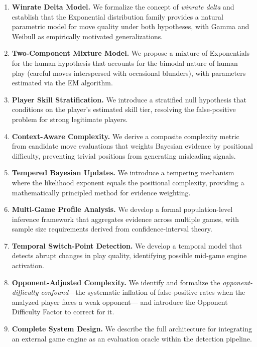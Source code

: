 \documentclass[11pt,a4paper]{article}
\begin{document}
\begin{enumerate}
    \item \textbf{Winrate Delta Model.} We formalize the concept of
          \emph{winrate delta} and establish that the Exponential distribution
          family provides a natural parametric model for move quality under both
          hypotheses, with Gamma and Weibull as empirically motivated
          generalizations.
    \item \textbf{Two-Component Mixture Model.} We propose a mixture of
          Exponentials for the human hypothesis that accounts for the bimodal
          nature of human play (careful moves interspersed with occasional
          blunders), with parameters estimated via the EM algorithm.
    \item \textbf{Player Skill Stratification.} We introduce a stratified null
          hypothesis that conditions on the player's estimated skill tier,
          resolving the false-positive problem for strong legitimate players.
    \item \textbf{Context-Aware Complexity.} We derive a composite complexity
          metric from candidate move evaluations that weights Bayesian evidence
          by positional difficulty, preventing trivial positions from generating
          misleading signals.
    \item \textbf{Tempered Bayesian Updates.} We introduce a tempering mechanism
          where the likelihood exponent equals the positional complexity,
          providing a mathematically principled method for evidence weighting.
    \item \textbf{Multi-Game Profile Analysis.} We develop a formal
          population-level inference framework that aggregates evidence across
          multiple games, with sample size requirements derived from
          confidence-interval theory.
    \item \textbf{Temporal Switch-Point Detection.} We develop a temporal model
          that detects abrupt changes in play quality, identifying possible
          mid-game engine activation.
    \item \textbf{Opponent-Adjusted Complexity.} We identify and formalize the
          \emph{opponent-difficulty confound}---the systematic inflation of
          false-positive rates when the analyzed player faces a weak opponent---
          and introduce the Opponent Difficulty Factor to correct for it.
    \item \textbf{Complete System Design.} We describe the full architecture for
          integrating an external game engine as an evaluation oracle within the
          detection pipeline.
\end{enumerate}
\end{document}
